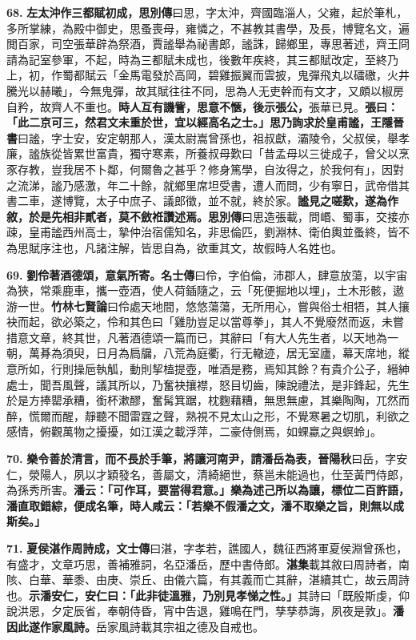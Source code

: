 \textbf{68.} \textbf{左太沖作三都賦初成，}{\footnotesize \textbf{思別傳}曰思，字太沖，齊國臨淄人，父雍，起於筆札，多所掌練，為殿中御史，思蚤喪母，雍憐之，不甚教其書學，及長，博覽名文，遍閲百家，司空張華辟為祭酒，賈謐舉為祕書郎，謐誅，歸鄉里，專思著述，齊王冏請為記室參軍，不起，時為三都賦未成也，後數年疾終，其三都賦改定，至終乃上，初，作蜀都賦云「金馬電發於高岡，碧雞振翼而雲披，鬼彈飛丸以礌礉，火井騰光以赫曦」，今無鬼彈，故其賦往往不同，思為人无吏幹而有文才，又頗以椒房自矜，故齊人不重也。}\textbf{時人互有譏訾，思意不愜，後示張公，}{\footnotesize 張華已見。}\textbf{張曰：「此二京可三，然君文未重於世，宜以經高名之士。」思乃詢求於皇甫謐，}{\footnotesize \textbf{王隱晉書}曰謐，字士安，安定朝那人，漢太尉嵩曾孫也，祖叔獻，灞陵令，父叔侯，舉孝廉，謐族從皆累世富貴，獨守寒素，所養叔母歎曰「昔孟母以三徙成子，曾父以烹豕存教，豈我居不卜鄰，何爾魯之甚乎？修身篤學，自汝得之，於我何有」，因對之流涕，謐乃感激，年二十餘，就鄉里席坦受書，遭人而問，少有寧日，武帝借其書二車，遂博覽，太子中庶子、議郎徵，並不就，終於家。}\textbf{謐見之嗟歎，遂為作敘，於是先相非貳者，莫不斂袵讚述焉。}{\footnotesize \textbf{思別傳}曰思造張載，問㟭、蜀事，交接亦疎，皇甫謐西州高士，摯仲治宿儒知名，非思倫匹，劉淵林、衛伯輿並蚤終，皆不為思賦序注也，凡諸注解，皆思自為，欲重其文，故假時人名姓也。}

\textbf{69.} \textbf{劉伶著酒德頌，意氣所寄。}{\footnotesize \textbf{名士傳}曰伶，字伯倫，沛郡人，肆意放蕩，以宇宙為狹，常乘鹿車，攜一壺酒，使人荷鍤隨之，云「死便掘地以埋」，土木形骸，遨游一世。\textbf{竹林七賢論}曰伶處天地間，悠悠蕩蕩，无所用心，嘗與俗士相牾，其人攘袂而起，欲必築之，伶和其色曰「雞肋豈足以當尊拳」，其人不覺廢然而返，未嘗措意文章，終其世，凡著酒德頌一篇而已，其辭曰「有大人先生者，以天地為一朝，萬朞為須臾，日月為扃牖，八荒為庭衢，行无轍迹，居无室廬，幕天席地，縱意所如，行則操巵執觚，動則挈榼提壺，唯酒是務，焉知其餘？有貴介公子，縉紳處士，聞吾風聲，議其所以，乃奮袂攘襟，怒目切齒，陳說禮法，是非鋒起，先生於是方捧罌承糟，銜杯漱醪，奮髯箕踞，枕麴藉糟，無思無慮，其樂陶陶，兀然而醉，慌爾而醒，靜聽不聞雷霆之聲，熟視不見太山之形，不覺寒暑之切肌，利欲之感情，俯觀萬物之擾擾，如江漢之載浮萍，二豪侍側焉，如蜾蠃之與螟蛉」。}

\textbf{70.} \textbf{樂令善於清言，而不長於手筆，將讓河南尹，請潘岳為表，}{\footnotesize \textbf{晉陽秋}曰岳，字安仁，滎陽人，夙以才穎發名，善屬文，清綺絕世，蔡邕未能過也，仕至黃門侍郎，為孫秀所害。}\textbf{潘云：「可作耳，要當得君意。」樂為述己所以為讓，標位二百許語，潘直取錯綜，便成名筆，時人咸云：「若樂不假潘之文，潘不取樂之旨，則無以成斯矣。」}

\textbf{71.} \textbf{夏侯湛作周詩成，}{\footnotesize \textbf{文士傳}曰湛，字孝若，譙國人，魏征西將軍夏侯淵曾孫也，有盛才，文章巧思，善補雅詞，名亞潘岳，歷中書侍郎。\textbf{湛集}載其敘曰周詩者，南陔、白華、華黍、由庚、崇丘、由儀六篇，有其義而亡其辭，湛續其亡，故云周詩也。}\textbf{示潘安仁，安仁曰：「此非徒溫雅，乃別見孝悌之性。」}{\footnotesize 其詩曰「既殷斯虔，仰說洪恩，夕定辰省，奉朝侍昏，宵中告退，雞鳴在門，孳孳恭誨，夙夜是敦」。}\textbf{潘因此遂作家風詩。}{\footnotesize 岳家風詩載其宗祖之德及自戒也。}

